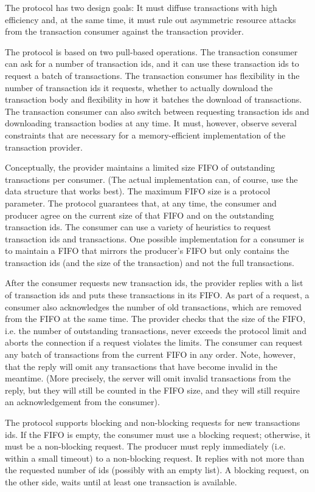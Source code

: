 The protocol has two design goals: It must diffuse transactions with high efficiency
and, at the same time, it must rule out
asymmetric resource attacks from the transaction consumer against the transaction provider.

The protocol is based on two pull-based operations.
The transaction consumer can ask for a number of transaction ids, and it can use these
transaction ids to request a batch of transactions.
The transaction consumer has flexibility in the number of transaction ids it requests,
whether to actually download the transaction body
and flexibility in how it batches the download of transactions.
The transaction consumer can also switch between requesting transaction ids and downloading
transaction bodies at any time.
It must, however, observe several constraints that are necessary for a memory-efficient implementation
of the transaction provider.

Conceptually, the provider maintains a limited size FIFO of outstanding transactions per consumer.
(The actual implementation can, of course, use the data structure that works best).
The maximum FIFO size is a protocol parameter.
The protocol guarantees that, at any time, the consumer and producer agree on the current size of
that FIFO and on the outstanding transaction ids.
The consumer can use a variety of heuristics to request transaction ids and transactions.
One possible implementation for a consumer is to maintain a FIFO that mirrors the producer's FIFO
but only contains the transaction ids (and the size of the transaction) and not the full transactions.

After the consumer requests new transaction ids, the provider replies with a list of transaction ids and
puts these transactions in its FIFO.
As part of a request, a consumer also acknowledges the number of old transactions,
which are removed from the FIFO at the same time.
The provider checks that the size of the FIFO, i.e. the number of outstanding transactions,
never exceeds the protocol limit and aborts the connection if a request violates the limits.
The consumer can request any batch of transactions from the current FIFO in any order.
Note, however, that the reply will omit any transactions that have become invalid in the meantime.
(More precisely, the server will omit invalid transactions from the reply, but they will still be counted in the FIFO
size, and they will still require an acknowledgement from the consumer).

The protocol supports blocking and non-blocking requests for new transactions ids.
If the FIFO is empty, the consumer must use a blocking request; otherwise, it must be a non-blocking request.
The producer must reply immediately (i.e. within a small timeout) to a non-blocking request.
It replies with not more than the requested number of ids (possibly with an empty list).
A blocking request, on the other side, waits until at least one transaction is available.
